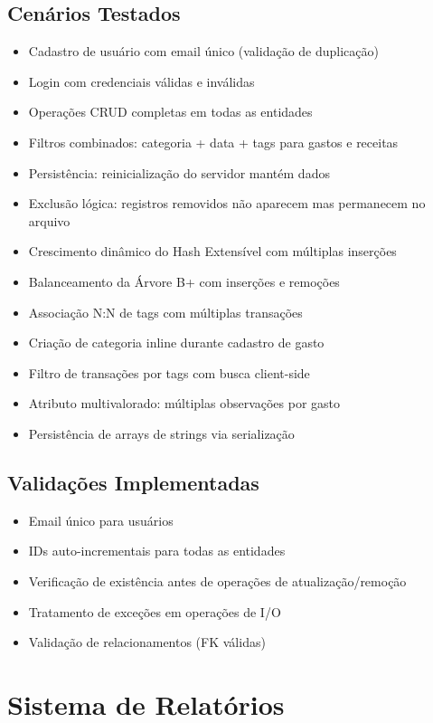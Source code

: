 \documentclass[12pt,a4paper]{article}
\begin{document}
\subsection*{Cenários Testados}
\begin{itemize}
  \item Cadastro de usuário com email único (validação de duplicação)
  \item Login com credenciais válidas e inválidas
  \item Operações CRUD completas em todas as entidades
  \item Filtros combinados: categoria + data + tags para gastos e receitas
  \item Persistência: reinicialização do servidor mantém dados
  \item Exclusão lógica: registros removidos não aparecem mas permanecem no arquivo
  \item Crescimento dinâmico do Hash Extensível com múltiplas inserções
  \item Balanceamento da Árvore B+ com inserções e remoções
  \item Associação N:N de tags com múltiplas transações
  \item Criação de categoria inline durante cadastro de gasto
  \item Filtro de transações por tags com busca client-side
  \item Atributo multivalorado: múltiplas observações por gasto
  \item Persistência de arrays de strings via serialização
\end{itemize}

\subsection*{Validações Implementadas}
\begin{itemize}
  \item Email único para usuários
  \item IDs auto-incrementais para todas as entidades
  \item Verificação de existência antes de operações de atualização/remoção
  \item Tratamento de exceções em operações de I/O
  \item Validação de relacionamentos (FK válidas)
\end{itemize}

\section{Sistema de Relatórios}
\end{document}
